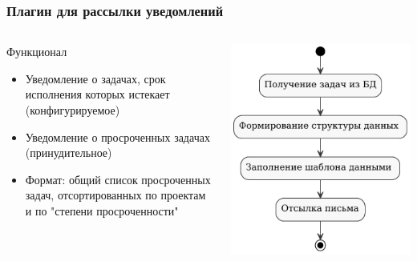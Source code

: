 \documentclass[unicode]{beamer}
\begin{document}
\begin{frame}
\transwipe[direction=90]
\frametitle{Плагин для рассылки уведомлений}
\begin{columns}
\begin{column}{0.6\textwidth}
\begin{block}{Функционал}
\begin{itemize}
  \item Уведомление о задачах, срок исполнения которых истекает (конфигурируемое)
  \item Уведомление о просроченных задачах (принудительное)
  \item Формат: общий список просроченных задач, отсортированных по проектам и по "степени просроченности"
\end{itemize}
\end{block}
\end{column}
\begin{column}{0.4\textwidth}
\centerline{\includegraphics[width=1\textwidth]{reminder-plugin.pdf}}
\end{column}
\end{columns}
\end{frame}
\end{document}
